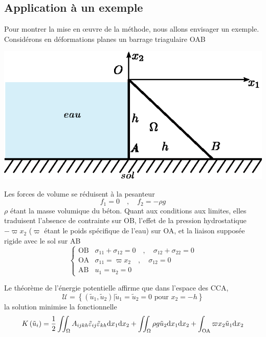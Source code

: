 \subsection{Application à un exemple} \label{ssec:Ch09-3.2}
Pour montrer la mise en œuvre de la méthode, nous allons envisager un exemple.
Considérons en déformations planes un barrage triagulaire OAB
\begin{center}
    \includegraphics{../images/T1_Ch09-05}
\end{center}
Les forces de volume se réduisent à la pesanteur 
\begin{equation}
    f_1 = 0 \quad,\quad f_2 = -\rho g
    \label{eq:Ch09-067}
\end{equation}
$\rho$ étant la masse volumique du béton.
Quant aux conditions aux limites, elles traduisent l'absence de contrainte sur OB, l'effet de la pression hydrostatique $-\varpi x_2$ ($\varpi$ étant le poids spécifique de l'eau) sur OA, et la liaison supposée rigide avec le sol sur AB 
\begin{equation}
    \left\{
    \begin{aligned}
        \text{OB} & \sigma_{11} + \sigma_{12} = 0 \quad,\quad \sigma_{12} + \sigma_{22} = 0 \\
        \text{OA} & \sigma_{11} = \varpi x_2 \quad,\quad \sigma_{12} = 0 \\
        \text{AB} & u_1 = u_2 = 0
    \end{aligned}
    \right.
    \label{eq:Ch09-068}
\end{equation}

Le théorème de l'énergie potentielle affirme que dans l'espace des CCA, 
\begin{equation}
    \mathcal{U} = \left\{ \left( \tilde{u}_1, \tilde{u}_2 \right) | \tilde{u}_1 = \tilde{u}_2 = 0 \text{ pour } x_2 = -h \right\}
    \label{eq:Ch09-069}
\end{equation}
la solution minimise la fonctionnelle 
\begin{equation}
    K\left( \tilde{u}_i \right) = \frac{1}{2} \iint_{\Omega} A_{ijkh} \tilde{\varepsilon}_{ij} \tilde{\varepsilon}_{kh} \mathrm{d} x_1 \mathrm{d} x_2 + \iint_{\Omega} \rho g \tilde{u}_2 \mathrm{d} x_1 \mathrm{d} x_2 + \int_{\text{OA}} \varpi x_2 \tilde{u}_1 \mathrm{d} x_2
    \label{eq:Ch09-070}
\end{equation}

